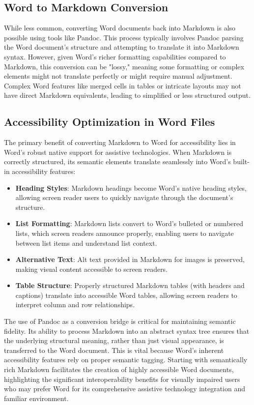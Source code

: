 \subsection{Word to Markdown Conversion}
While less common, converting Word documents back into Markdown is also possible using tools like Pandoc. This process typically involves Pandoc parsing the Word document's structure and attempting to translate it into Markdown syntax. However, given Word's richer formatting capabilities compared to Markdown, this conversion can be "lossy," meaning some formatting or complex elements might not translate perfectly or might require manual adjustment.\cite{PandocManual} Complex Word features like merged cells in tables or intricate layouts may not have direct Markdown equivalents, leading to simplified or less structured output.

\subsection{Accessibility Optimization in Word Files}
The primary benefit of converting Markdown to Word for accessibility lies in Word's robust native support for assistive technologies. When Markdown is correctly structured, its semantic elements translate seamlessly into Word's built-in accessibility features:
\begin{itemize}
    \item \textbf{Heading Styles}: Markdown headings become Word's native heading styles, allowing screen reader users to quickly navigate through the document's structure.\cite{DSU}\cite{CreateUW}
    \item \textbf{List Formatting}: Markdown lists convert to Word's bulleted or numbered lists, which screen readers announce properly, enabling users to navigate between list items and understand list context.\cite{DSU}
    \item \textbf{Alternative Text}: Alt text provided in Markdown for images is preserved, making visual content accessible to screen readers.\cite{DSU}
    \item \textbf{Table Structure}: Properly structured Markdown tables (with headers and captions) translate into accessible Word tables, allowing screen readers to interpret column and row relationships.\cite{DSU}
\end{itemize}
The use of Pandoc as a conversion bridge is critical for maintaining semantic fidelity. Its ability to process Markdown into an abstract syntax tree ensures that the underlying structural meaning, rather than just visual appearance, is transferred to the Word document. This is vital because Word's inherent accessibility features rely on proper semantic tagging. Starting with semantically rich Markdown facilitates the creation of highly accessible Word documents, highlighting the significant interoperability benefits for visually impaired users who may prefer Word for its comprehensive assistive technology integration and familiar environment.

